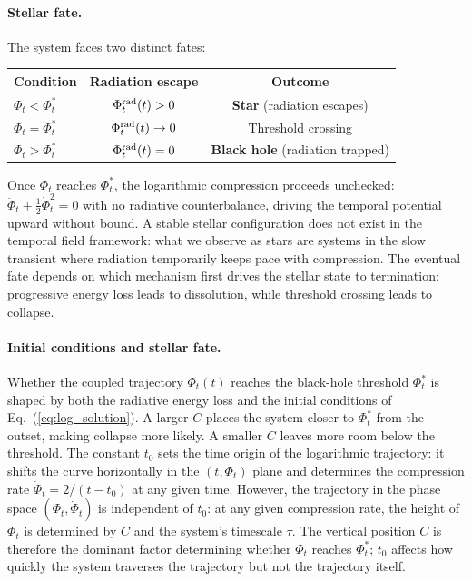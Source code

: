 \documentclass[12pt]{article}
\begin{document}
\paragraph{Stellar fate.}

The system faces two distinct fates:
\begin{center}
\renewcommand{\arraystretch}{1.3}
\begin{tabular}{lcc}
\hline
Condition & Radiation escape & Outcome \\
\hline
$\Phi_t < \Phi_t^*$ & $\Phi_t^{\rm rad}(t) > 0$ & \textbf{Star} (radiation escapes) \\
$\Phi_t = \Phi_t^*$ & $\Phi_t^{\rm rad}(t) \to 0$ & Threshold crossing \\
$\Phi_t > \Phi_t^*$ & $\Phi_t^{\rm rad}(t) = 0$ & \textbf{Black hole} (radiation trapped) \\
\hline
\end{tabular}
\end{center}
Once $\Phi_t$ reaches $\Phi_t^*$, the logarithmic compression proceeds unchecked: $\ddot{\Phi}_t + \frac{1}{2}\dot{\Phi}_t^2 = 0$ with no radiative counterbalance, driving the temporal potential upward without bound. A stable stellar configuration does not exist in the temporal field framework: what we observe as stars are systems in the slow transient where radiation temporarily keeps pace with compression. The eventual fate depends on which mechanism first drives the stellar state to termination: progressive energy loss leads to dissolution, while threshold crossing leads to collapse.

\paragraph{Initial conditions and stellar fate.}

Whether the coupled trajectory $\Phi_t(t)$ reaches the black-hole threshold $\Phi_t^*$ is shaped by both the radiative energy loss and the initial conditions of Eq.~(\ref{eq:log_solution}). A larger $C$ places the system closer to $\Phi_t^*$ from the outset, making collapse more likely. A smaller $C$ leaves more room below the threshold. The constant $t_0$ sets the time origin of the logarithmic trajectory: it shifts the curve horizontally in the $(t, \Phi_t)$ plane and determines the compression rate $\dot{\Phi}_t = 2/(t - t_0)$ at any given time. However, the trajectory in the phase space $(\Phi_t, \dot{\Phi}_t)$ is independent of $t_0$: at any given compression rate, the height of $\Phi_t$ is determined by $C$ and the system's timescale $\tau$. The vertical position $C$ is therefore the dominant factor determining whether $\Phi_t$ reaches $\Phi_t^*$; $t_0$ affects how quickly the system traverses the trajectory but not the trajectory itself.
\end{document}
